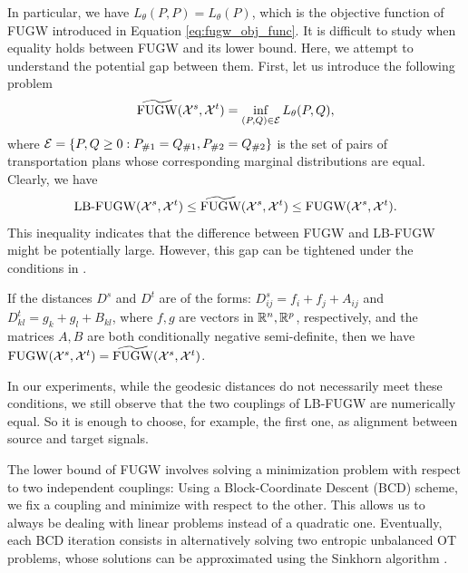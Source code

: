 In particular, we have $L_{\theta}(P, P) = L_{\theta}(P)$,
which is the objective function of FUGW introduced in Equation \eqref{eq:fugw_obj_func}.
It is difficult to study when equality holds between FUGW and its lower bound.
Here, we attempt to understand the potential gap between them.
First, let us introduce the following problem
\begin{equation}
  \widetilde{\text{FUGW}}(\mathcal X^s, \mathcal X^t) = \inf_{(P, Q) \in \mathcal E} L_{\theta}(P, Q),
\end{equation}
where $\mathcal E = \{P, Q \geq 0: P_{\#1} = Q_{\#1}, P_{\#2} = Q_{\#2} \}$ is
the set of pairs of transportation plans whose corresponding marginal distributions are equal.
Clearly, we have
\begin{equation}
    \text{LB-FUGW} (\mathcal X^s, \mathcal X^t) \leq \widetilde{\text{FUGW}}(\mathcal X^s, \mathcal X^t)
    \leq \text{FUGW}(\mathcal X^s, \mathcal X^t).
\end{equation}
This inequality indicates that the difference between FUGW and LB-FUGW might be potentially large.
However, this gap can be tightened under the conditions in .
\begin{corollary} \label{coro:ugw_ucoot}
    If the distances $D^s$ and $D^t$ are of the forms: $D^s_{ij} = f_i + f_j + A_{ij}$ and
    $D^t_{kl} = g_k + g_l + B_{kl}$, where $f, g$ are vectors in $\mathbb R^n, \mathbb R^p$, respectively,
    and the matrices $A, B$ are both conditionally negative semi-definite, then we have
    $\text{FUGW} (\mathcal X^s, \mathcal X^t) = \widetilde{\text{FUGW}}(\mathcal X^s, \mathcal X^t)$.
\end{corollary}
In our experiments, while the geodesic distances do not necessarily meet these conditions,
we still observe that the two couplings of LB-FUGW are numerically equal.
So it is enough to choose, for example, the first one, as alignment between source and target signals.

The lower bound of FUGW involves solving a minimization problem with respect to two independent couplings:
Using a Block-Coordinate Descent (BCD) scheme, we fix a coupling and minimize
with respect to the other. This allows us to always be dealing with linear problems
instead of a quadratic one. Eventually, each BCD iteration consists in alternatively solving
two entropic unbalanced OT problems, whose solutions can be approximated using
the Sinkhorn algorithm \citep{Sejourne19}.

